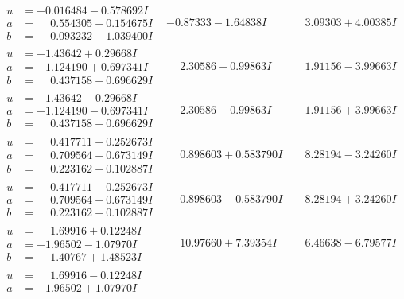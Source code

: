 \documentclass[1p]{elsarticle_modified}
\theoremstyle{definition}
\begin{document}
$$\begin{array}{c|c|c}
\begin{aligned}
u &= -0.016484 - 0.578692 I \\
a &= \phantom{-}0.554305 - 0.154675 I \\
b &= \phantom{-}0.093232 - 1.039400 I\end{aligned}
 & -0.87333 - 1.64838 I & \phantom{-}3.09303 + 4.00385 I \\ \hline\begin{aligned}
u &= -1.43642 + 0.29668 I \\
a &= -1.124190 + 0.697341 I \\
b &= \phantom{-}0.437158 - 0.696629 I\end{aligned}
 & \phantom{-}2.30586 + 0.99863 I & \phantom{-}1.91156 - 3.99663 I \\ \hline\begin{aligned}
u &= -1.43642 - 0.29668 I \\
a &= -1.124190 - 0.697341 I \\
b &= \phantom{-}0.437158 + 0.696629 I\end{aligned}
 & \phantom{-}2.30586 - 0.99863 I & \phantom{-}1.91156 + 3.99663 I \\ \hline\begin{aligned}
u &= \phantom{-}0.417711 + 0.252673 I \\
a &= \phantom{-}0.709564 + 0.673149 I \\
b &= \phantom{-}0.223162 - 0.102887 I\end{aligned}
 & \phantom{-}0.898603 + 0.583790 I & \phantom{-}8.28194 - 3.24260 I \\ \hline\begin{aligned}
u &= \phantom{-}0.417711 - 0.252673 I \\
a &= \phantom{-}0.709564 - 0.673149 I \\
b &= \phantom{-}0.223162 + 0.102887 I\end{aligned}
 & \phantom{-}0.898603 - 0.583790 I & \phantom{-}8.28194 + 3.24260 I \\ \hline\begin{aligned}
u &= \phantom{-}1.69916 + 0.12248 I \\
a &= -1.96502 - 1.07970 I \\
b &= \phantom{-}1.40767 + 1.48523 I\end{aligned}
 & \phantom{-}10.97660 + 7.39354 I & \phantom{-}6.46638 - 6.79577 I \\ \hline\begin{aligned}
u &= \phantom{-}1.69916 - 0.12248 I \\
a &= -1.96502 + 1.07970 I \\

\end{aligned}
\end{array}$$
\end{document}
